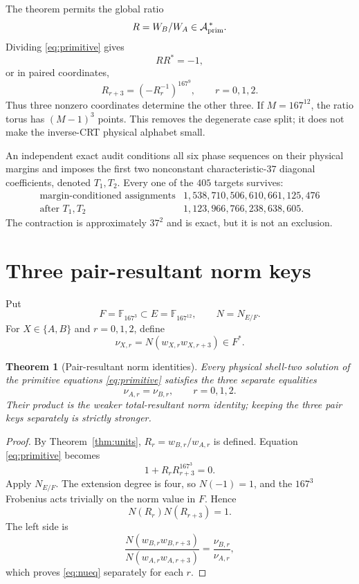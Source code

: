 \documentclass[11pt]{article}
\newtheorem{theorem}{Theorem}
\theoremstyle{remark}
\newcommand{\F}{\mathbb F}
\begin{document}
The theorem permits the global ratio
\[
 R=W_B/W_A\in\mathcal A_{\rm prim}^{\,*}.
\]
Dividing \eqref{eq:primitive} gives
\[
 RR^*=-1,
\]
or in paired coordinates,
\begin{equation}
 R_{r+3}=\left(-R_r^{-1}\right)^{167^9},
 \qquad r=0,1,2.
 \label{eq:ratio}
\end{equation}
Thus three nonzero coordinates determine the other three.  If
$M=167^{12}$, the ratio torus has $(M-1)^3$ points.  This removes the
degenerate case split; it does not make the inverse-CRT physical alphabet
small.

An independent exact audit conditions all six phase sequences on their
physical margins and imposes the first two nonconstant
characteristic-$37$ diagonal coefficients, denoted $T_1,T_2$.  Every one of
the $405$ targets survives:
\[
\begin{array}{lr}
\text{margin-conditioned assignments}
 &1{,}538{,}710{,}506{,}610{,}661{,}125{,}476\\
\text{after }T_1,T_2
 &1{,}123{,}966{,}766{,}238{,}638{,}605.
\end{array}
\]
The contraction is approximately $37^2$ and is exact, but it is not an
exclusion.

\section{Three pair-resultant norm keys}
\label{sec:resultant}

Put
\[
 F=\F_{167^3}\subset E=\F_{167^{12}},\qquad
 N=N_{E/F}.
\]
For $X\in\{A,B\}$ and $r=0,1,2$, define
\begin{equation}
 \nu_{X,r}
 =N\!\left(w_{X,r}w_{X,r+3}\right)\in F^*.
 \label{eq:nu}
\end{equation}

\begin{theorem}[Pair-resultant norm identities]
\label{thm:pairnorm}
Every physical shell-two solution of the primitive equations
\eqref{eq:primitive} satisfies the three separate equalities
\begin{equation}
 \nu_{A,r}=\nu_{B,r},\qquad r=0,1,2.
 \label{eq:nueq}
\end{equation}
Their product is the weaker total-resultant norm identity; keeping the
three pair keys separately is strictly stronger.
\end{theorem}

\begin{proof}
By Theorem~\ref{thm:units}, $R_r=w_{B,r}/w_{A,r}$ is defined.  Equation
\eqref{eq:primitive} becomes
\[
 1+R_rR_{r+3}^{167^3}=0.
\]
Apply $N_{E/F}$.  The extension degree is four, so $N(-1)=1$, and the
$167^3$ Frobenius acts trivially on the norm value in $F$.  Hence
\[
 N(R_r)N(R_{r+3})=1.
\]
The left side is
\[
 \frac{N(w_{B,r}w_{B,r+3})}
 {N(w_{A,r}w_{A,r+3})}
 =\frac{\nu_{B,r}}{\nu_{A,r}},
\]
which proves \eqref{eq:nueq} separately for each $r$.
\end{proof}
\end{document}
